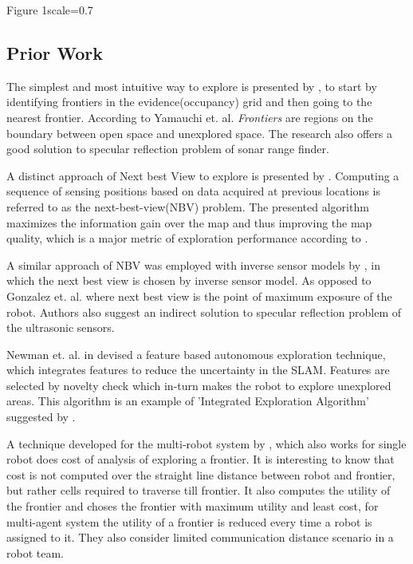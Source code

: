 {Figure 1}{scale=0.7}

\subsection{Prior Work}
\label{sec:priorwork}
The simplest and most intuitive way to explore is presented by \cite{Yamauchi1997}, to start by
identifying frontiers in the evidence(occupancy) grid and then going to the nearest frontier.
According to Yamauchi et. al. \cite{Yamauchi1997} \textit{Frontiers} are regions on the boundary
between open space and unexplored space. The research also offers a good solution to specular
reflection problem of sonar range finder.\par

A distinct approach of Next best View to explore is presented by \cite{Gonzalez-Banos2002}.
Computing a sequence of sensing positions based on data acquired at previous locations is referred
to as the next-best-view(NBV) problem. The presented algorithm maximizes the information gain over
the map and thus improving the map quality, which is a major metric of exploration performance
according to \cite{Yan2015}.\par

A similar approach of NBV was employed with inverse sensor models by \cite{Grabowski2003}, in which
the next best view is chosen by inverse sensor model. As opposed to Gonzalez et. al. where next best
view is the point of maximum exposure of the robot. Authors also suggest an indirect solution to
specular reflection problem of the ultrasonic sensors.\par

Newman et. al. in \cite{Newman2003} devised a feature based autonomous exploration technique, which
integrates features to reduce the uncertainty in the SLAM. Features are selected by novelty check
which in-turn makes the robot to explore unexplored areas. This algorithm is an example of
'Integrated Exploration Algorithm' suggested by \cite{Juliae2012}.\par

A technique developed for the multi-robot system by \cite{Burgard2005}, which also works for single
robot does cost of analysis of exploring a frontier. It is interesting to know that cost is not
computed over the straight line distance between robot and frontier, but rather cells required to
traverse till frontier. It also computes the utility of the frontier and choses the frontier with
maximum utility and least cost, for multi-agent system the utility of a frontier is reduced every
time a robot is assigned to it. They also consider limited communication distance scenario in a
robot team.\par


